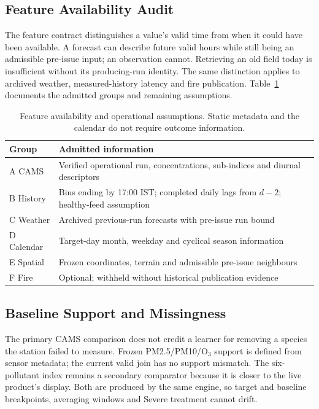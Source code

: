\subsection{Feature Availability Audit}
The feature contract distinguishes a value's valid time from when it could
have been available. A forecast can describe future valid hours while still
being an admissible pre-issue input; an observation cannot. Retrieving an old
field today is insufficient without its producing-run identity. The same
distinction applies to archived weather, measured-history latency and fire
publication. Table~\ref{tab:availability} documents the admitted groups and
remaining assumptions.
\begin{table}[t]\centering\footnotesize
\caption{Feature availability and operational assumptions. Static metadata and the calendar do not require outcome information.}
\label{tab:availability}
\setlength{\tabcolsep}{4pt}
\begin{tabular}{lp{}}
\toprule
Group & Admitted information\\\midrule
A CAMS & Verified operational run, concentrations, sub-indices and diurnal descriptors\\
B History & Bins ending by 17:00 IST; completed daily lags from $d-2$; healthy-feed assumption\\
C Weather & Archived previous-run forecasts with pre-issue run bound\\
D Calendar & Target-day month, weekday and cyclical season information\\
E Spatial & Frozen coordinates, terrain and admissible pre-issue neighbours\\
F Fire & Optional; withheld without historical publication evidence\\
\bottomrule\end{tabular}
\end{table}
\subsection{Baseline Support and Missingness}
The primary CAMS comparison does not credit a learner for removing a species
the station failed to measure. Frozen PM2.5/PM10/O$_3$ support is defined from
sensor metadata; the current valid join has no support mismatch. The
six-pollutant index remains a secondary comparator because it is closer to
the live product's display. Both are produced by the same engine, so target
and baseline breakpoints, averaging windows and Severe treatment cannot drift.

